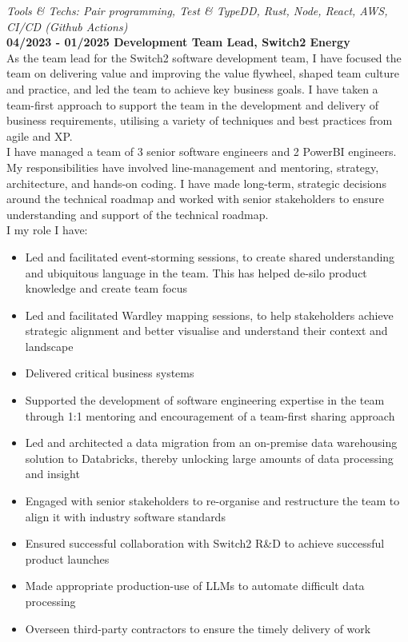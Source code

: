 \bigskip

\emph{Tools \& Techs: Pair programming, Test \& TypeDD, Rust, Node, React, AWS, CI/CD (Github Actions)}\\

\textbf{04/2023 - 01/2025 \hspace{2.75em}Development Team Lead, Switch2 Energy}\\

As the team lead for the Switch2 software development team, I have focused the team on delivering value and improving the value flywheel, shaped team culture and practice, and led the team to achieve key business goals. I have taken a team-first approach to support the team in the development and delivery of business requirements, utilising a variety of techniques and best practices from agile and XP.\\

I have managed a team of 3 senior software engineers and 2 PowerBI engineers. My responsibilities have involved line-management and mentoring, strategy, architecture, and hands-on coding. I have made long-term, strategic decisions around the technical roadmap and worked with senior stakeholders to ensure understanding and support of the technical roadmap.\\

I my role I have:\\

\begin{itemize}
  \item Led and facilitated event-storming sessions, to create shared understanding and ubiquitous language in the team. This has helped de-silo product knowledge and create team focus
  \item Led and facilitated Wardley mapping sessions, to help stakeholders achieve strategic alignment and better visualise and understand their context and landscape
  \item Delivered critical business systems
  \item Supported the development of software engineering expertise in the team through 1:1 mentoring and encouragement of a team-first sharing approach
  \item Led and architected a data migration from an on-premise data warehousing solution to Databricks, thereby unlocking large amounts of data processing and insight
  \item Engaged with senior stakeholders to re-organise and restructure the team to align it with industry software standards
  \item Ensured successful collaboration with Switch2 R\&D to achieve successful product launches
  \item Made appropriate production-use of LLMs to automate difficult data processing
  \item Overseen third-party contractors to ensure the timely delivery of work
\end{itemize}

